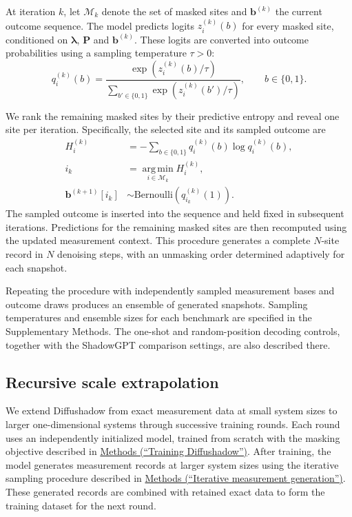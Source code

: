 \documentclass[pdflatex,sn-nature]{sn-jnl}%
\theoremstyle{thmstyleone}%
\theoremstyle{thmstyletwo}%
\theoremstyle{thmstylethree}%
\begin{document}
At iteration \(k\), let \(\mathcal{M}_k\) denote the set of masked sites and \(\mathbf{b}^{(k)}\) the current outcome sequence. The model predicts logits \(z_i^{(k)}(b)\) for every masked site, conditioned on \(\boldsymbol{\lambda}\), \(\mathbf{P}\) and \(\mathbf{b}^{(k)}\). These logits are converted into outcome probabilities using a sampling temperature \(\tau>0\):
\begin{equation}
\label{eq:generation_probability}
q_i^{(k)}(b)
=
\frac{\exp\!\left(z_i^{(k)}(b)/\tau\right)}
{\sum_{b'\in\{0,1\}}
\exp\!\left(z_i^{(k)}(b')/\tau\right)},
\qquad b\in\{0,1\}.
\end{equation}

We rank the remaining masked sites by their predictive entropy and reveal one site per iteration. Specifically, the selected site and its sampled outcome are
\begin{equation}
\label{eq:entropy_decoding}
\begin{aligned}
H_i^{(k)}
&=
-\sum_{b\in\{0,1\}}
q_i^{(k)}(b)\log q_i^{(k)}(b),\\
i_k
&=
\operatorname*{arg\,min}_{i\in\mathcal{M}_k}
H_i^{(k)},\\
\mathbf{b}^{(k+1)}[i_k]
&\sim
\mathrm{Bernoulli}\!\left(q_{i_k}^{(k)}(1)\right).
\end{aligned}
\end{equation}
The sampled outcome is inserted into the sequence and held fixed in subsequent iterations. Predictions for the remaining masked sites are then recomputed using the updated measurement context. This procedure generates a complete \(N\)-site record in \(N\) denoising steps, with an unmasking order determined adaptively for each snapshot.

Repeating the procedure with independently sampled measurement bases and outcome draws produces an ensemble of generated snapshots. Sampling temperatures and ensemble sizes for each benchmark are specified in the Supplementary Methods. The one-shot and random-position decoding controls, together with the ShadowGPT comparison settings, are also described there.



\subsection{Recursive scale extrapolation}
\label{sec:method_recursive}

We extend Diffushadow from exact measurement data at small system sizes to larger one-dimensional systems through successive training rounds. Each round uses an independently initialized model, trained from scratch with the masking objective described in \hyperref[sec:method_training]{Methods (``Training Diffushadow'')}. After training, the model generates measurement records at larger system sizes using the iterative sampling procedure described in \hyperref[sec:method_generation]{Methods (``Iterative measurement generation'')}. These generated records are combined with retained exact data to form the training dataset for the next round.
\end{document}
